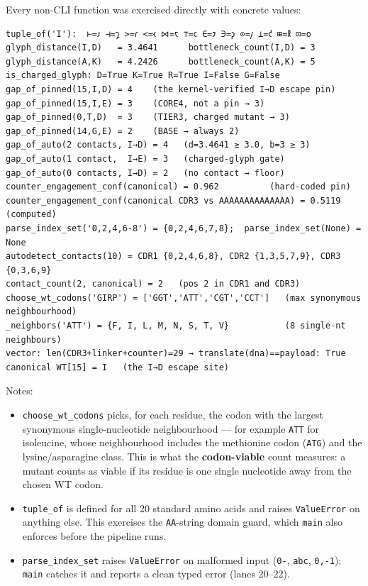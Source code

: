 Every non-CLI function was exercised directly with concrete values:

\begin{verbatim}
tuple_of('I'):  ⊢=𐑨 ⊣=𐑡 ≻=𐑩 ≺=𐑬 ⋈=𐑱 ⊤=𐑤 ∈=𐑲 ∋=𐑜 ⊙=𐑢 ⊥=𐑒 ⊞=𐑙 ⊡=𐑴
glyph_distance(I,D)   = 3.4641      bottleneck_count(I,D) = 3
glyph_distance(A,K)   = 4.2426      bottleneck_count(A,K) = 5
is_charged_glyph: D=True K=True R=True I=False G=False
gap_of_pinned(15,I,D) = 4    (the kernel-verified I→D escape pin)
gap_of_pinned(15,I,E) = 3    (CORE4, not a pin → 3)
gap_of_pinned(0,T,D)  = 3    (TIER3, charged mutant → 3)
gap_of_pinned(14,G,E) = 2    (BASE → always 2)
gap_of_auto(2 contacts, I→D) = 4   (d=3.4641 ≥ 3.0, b=3 ≥ 3)
gap_of_auto(1 contact,  I→E) = 3   (charged-glyph gate)
gap_of_auto(0 contacts, I→D) = 2   (no contact → floor)
counter_engagement_conf(canonical) = 0.962          (hard-coded pin)
counter_engagement_conf(canonical CDR3 vs AAAAAAAAAAAAAA) = 0.5119  (computed)
parse_index_set('0,2,4,6-8') = {0,2,4,6,7,8};  parse_index_set(None) = None
autodetect_contacts(10) = CDR1 {0,2,4,6,8}, CDR2 {1,3,5,7,9}, CDR3 {0,3,6,9}
contact_count(2, canonical) = 2   (pos 2 in CDR1 and CDR3)
choose_wt_codons('GIRP') = ['GGT','ATT','CGT','CCT']   (max synonymous neighbourhood)
_neighbors('ATT') = {F, I, L, M, N, S, T, V}           (8 single-nt neighbours)
vector: len(CDR3+linker+counter)=29 → translate(dna)==payload: True
canonical WT[15] = I   (the I→D escape site)
\end{verbatim}

Notes:

\begin{itemize}
\tightlist
\item
  \texttt{choose\_wt\_codons} picks, for each residue, the codon with
  the largest synonymous single-nucleotide neighbourhood --- for example
  \texttt{ATT} for isoleucine, whose neighbourhood includes the
  methionine codon (\texttt{ATG}) and the lysine/asparagine class. This
  is what the \textbf{codon-viable} count measures: a mutant counts as
  viable if its residue is one single nucleotide away from the chosen WT
  codon.
\item
  \texttt{tuple\_of} is defined for all 20 standard amino acids and
  raises \texttt{ValueError} on anything else. This exercises the
  \texttt{AA}-string domain guard, which \texttt{main} also enforces
  before the pipeline runs.
\item
  \texttt{parse\_index\_set} raises \texttt{ValueError} on malformed
  input (\texttt{\textquotesingle{}0-\textquotesingle{}},
  \texttt{\textquotesingle{}abc\textquotesingle{}},
  \texttt{\textquotesingle{}0,-1\textquotesingle{}}); \texttt{main}
  catches it and reports a clean typed error (lanes 20--22).
\end{itemize}

